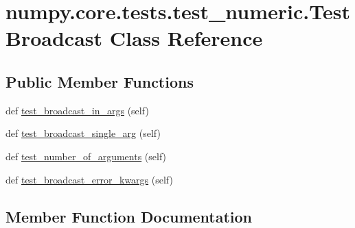 \hypertarget{classnumpy_1_1core_1_1tests_1_1test__numeric_1_1TestBroadcast}{}\section{numpy.\+core.\+tests.\+test\+\_\+numeric.\+Test\+Broadcast Class Reference}
\label{classnumpy_1_1core_1_1tests_1_1test__numeric_1_1TestBroadcast}
\subsection*{Public Member Functions}
\begin{DoxyCompactItemize}
\item 
def \hyperlink{classnumpy_1_1core_1_1tests_1_1test__numeric_1_1TestBroadcast_a46fe862b2a076d4a69a7ea0a1a3345ef}{test\+\_\+broadcast\+\_\+in\+\_\+args} (self)
\item 
def \hyperlink{classnumpy_1_1core_1_1tests_1_1test__numeric_1_1TestBroadcast_abfd7140b50beccba28b58b03148fa279}{test\+\_\+broadcast\+\_\+single\+\_\+arg} (self)
\item 
def \hyperlink{classnumpy_1_1core_1_1tests_1_1test__numeric_1_1TestBroadcast_a333e2493247ad93fad9bf05dde9e81dc}{test\+\_\+number\+\_\+of\+\_\+arguments} (self)
\item 
def \hyperlink{classnumpy_1_1core_1_1tests_1_1test__numeric_1_1TestBroadcast_a83443e87b70e1741b053df46410db78f}{test\+\_\+broadcast\+\_\+error\+\_\+kwargs} (self)
\end{DoxyCompactItemize}


\subsection{Member Function Documentation}
\mbox{\label{classnumpy_1_1core_1_1tests_1_1test__numeric_1_1TestBroadcast_a83443e87b70e1741b053df46410db78f}} 

